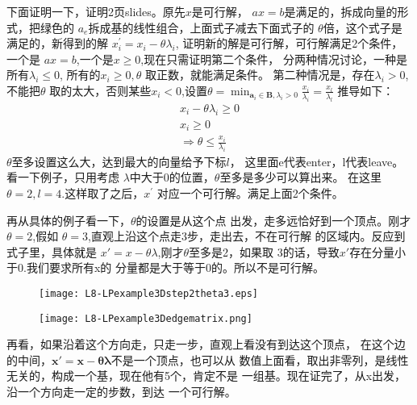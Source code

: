 {

	下面证明一下，证明2页slides。原先$x$是可行解，
	$ax = b$是满足的，拆成向量的形式，把绿色的
	$a_{e}$拆成基的线性组合，上面式子减去下面式子的
	$\theta$倍，这个式子是满足的，新得到的解
	$x^{\prime}_{i} = x_{i} - \theta\lambda_{i} $,
	证明新的解是可行解，可行解满足2个条件，一个是
	$ax = b$,一个是$x \geq 0$,现在只需证明第二个条件，
	分两种情况讨论，一种是所有$\lambda_{i} \leq 0$,
	所有的$x_{i} \geq 0,\theta$ 取正数，就能满足条件。
	第二种情况是，存在$\lambda_{i} > 0$,不能把$\theta$
	取的太大，否则某些$x_{i} < 0$,设置$\theta=\min_{\mathbf{a}_i\in \mathbf{B}, \lambda_i > 0} \frac{ x_{i} } { \lambda_i } = \frac{ x_{l} } { \lambda_l }$
	推导如下：
	\begin{eqnarray*}
		x_{i} - \theta\lambda_{i} \geq 0 \\
		x_{i} \geq 0 \\
		\Rightarrow \theta \leq \frac{x_{i}}{\lambda_{i}}
	\end{eqnarray*}
	$\theta$至多设置这么大，达到最大的向量给予下标$l$，
	这里面e代表enter，l代表leave。看一下例子，只用考虑
	$\lambda$中大于0的位置，$\theta$至多是多少可以算出来。
	在这里$\theta = 2, l = 4$.这样取了之后，$x^{\prime}$
	对应一个可行解。满足上面2个条件。

}
{
	再从具体的例子看一下，$\theta$的设置是从这个点
	出发，走多远恰好到一个顶点。刚才$\theta = 2$,假如
	$\theta = 3$,直观上沿这个点走3步，走出去，不在可行解
	的区域内。反应到式子里，具体就是
	$x'=x-\theta \lambda$,刚才$\theta$至多是2，如果取
	3的话，导致$x'$存在分量小于0.我们要求所有x的
	分量都是大于等于0的。所以不是可行解。
}
{
	 \begin{figure}[htb]%
	 	\begin{center}%
	 		\begin{minipage}{0.45\textwidth}%
	 			\texttt{[image: L8-LPexample3Dstep2theta3.eps]}%
	 		\end{minipage}%
	 		\quad
	 		\begin{minipage}{0.45\textwidth}
	 			\texttt{[image: L8-LPexample3Dedgematrix.png]}%
	 		\end{minipage}%
	 	\end{center}
	 \end{figure}
}
{
	再看，如果沿着这个方向走，只走一步，直观上看没有到达这个顶点，
	在这个边的中间，$\mathbf{x'=x-\theta \lambda}$不是一个顶点，也可以从
	数值上面看，取出非零列，是线性无关的，构成一个基，现在他有5个，肯定不是
	一组基。现在证完了，从x出发，沿一个方向走一定的步数，到达
	一个可行解。
}
